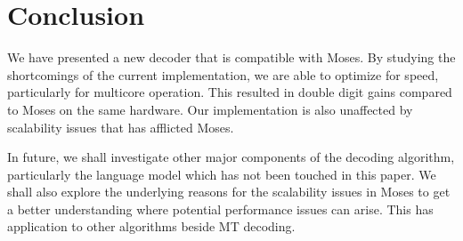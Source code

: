 \documentclass[11pt]{article}
\begin{document}
\section{Conclusion}

We have presented a new decoder that is compatible with Moses. By studying the shortcomings of the current implementation, we are able to optimize for speed, particularly for multicore operation. This resulted in double digit gains compared to Moses on the same hardware. Our implementation is also unaffected by scalability issues that has afflicted Moses. %

In future, we shall investigate other major components of the decoding algorithm, particularly the language model which has not been touched in this paper. We shall also explore the underlying reasons for the scalability issues in Moses to get a better understanding where potential performance issues can arise. This has application to other algorithms beside MT decoding. 

% 



\end{document}
